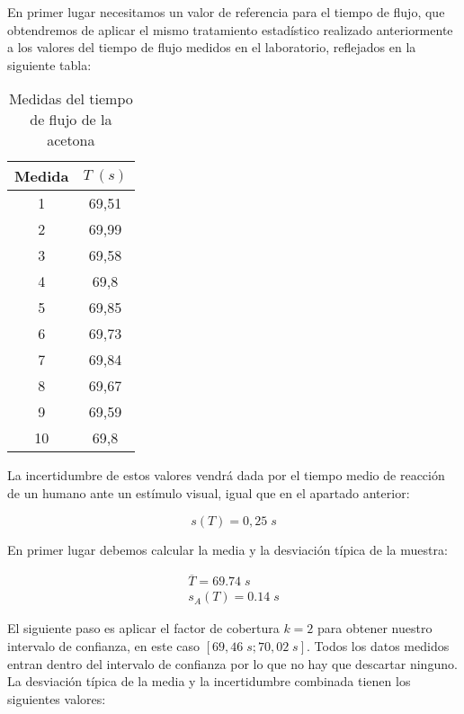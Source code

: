 \documentclass[a4paper,12pt,titlepage]{article}
\begin{document}
\par En primer lugar necesitamos un valor de referencia para el tiempo de flujo, que obtendremos de aplicar el mismo tratamiento estadístico realizado anteriormente a los valores del tiempo de flujo medidos en el laboratorio, reflejados en la siguiente tabla:

\begin{table}[h!]
    \centering
    \begin{tabular}{|c|c|}
    \hline
    Medida   & $T \; (s)$ \\ \hline
    1  & 69,51 \\ \hline
    2  & 69,99 \\ \hline
    3  & 69,58 \\ \hline
    4  & 69,8  \\ \hline
    5  & 69,85 \\ \hline
    6  & 69,73 \\ \hline
    7  & 69,84 \\ \hline
    8  & 69,67 \\ \hline
    9  & 69,59 \\ \hline
    10 & 69,8  \\ \hline
    \end{tabular}
    \caption{Medidas del tiempo de flujo de la acetona}
    \label{T acetona}
\end{table}

La incertidumbre de estos valores vendrá dada por el tiempo medio de reacción de un humano ante un estímulo visual, igual que en el apartado anterior:

\begin{equation}
    s(T) = 0,25 \; s
\end{equation}

En primer lugar debemos calcular la media y la desviación típica de la muestra:

\begin{equation}
    \begin{gathered}
        \overline{T} = 69.74 \;s\\
        s_A(T) = 0.14 \;s
    \end{gathered}
\end{equation}

El siguiente paso es aplicar el factor de cobertura $k=2$ para obtener nuestro intervalo de confianza, en este caso $[69,46\; s;70,02\; s]$. Todos los datos medidos entran dentro del intervalo de confianza por lo que no hay que descartar ninguno. La desviación típica de la media y la incertidumbre combinada tienen los siguientes valores:
\end{document}
